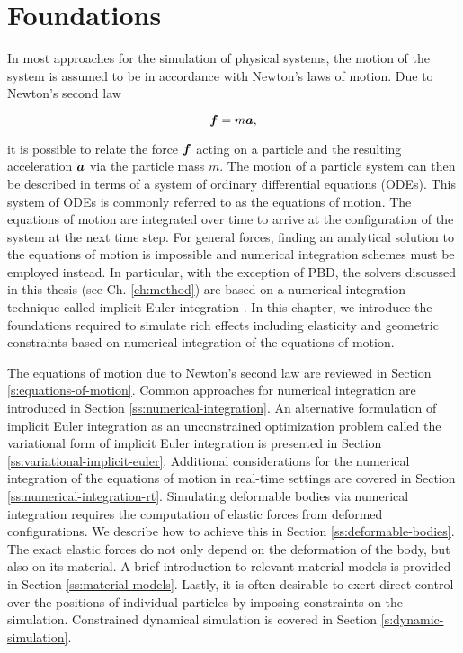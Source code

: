 \chapter{Foundations}\label{ch:foundations}

In most approaches for the simulation of physical systems, the motion of the system is assumed to be in accordance with Newton's laws of
motion. Due to Newton's second law 

\begin{equation}\label{newtons-laws-2}
    \bm{f} = m\bm{a},
\end{equation}

\noindent it is possible to relate the force $\bm{f}$ acting on a particle and the resulting acceleration $\bm{a}$ via the particle
mass $m$. The motion of a particle system can then be described in terms of a system of ordinary differential equations (ODEs). This
system of ODEs is commonly referred to as the equations of motion. The equations of motion are integrated over time to arrive 
at the configuration of the system at the next time step. For general forces, finding an analytical solution to the equations of motion
is impossible and numerical integration schemes must be employed instead. In particular, with the exception of PBD, the solvers discussed 
in this thesis (see Ch. \ref{ch:method}) are based on a numerical integration technique called implicit Euler integration 
\cite{macklin2016, bouaziz2014}. In this chapter, we introduce the foundations required to simulate rich effects including elasticity and 
geometric constraints based on numerical integration of the equations of motion.

The equations of motion due to Newton's second law are reviewed in Section \ref{s:equations-of-motion}. Common 
approaches for numerical integration are introduced in Section \ref{ss:numerical-integration}. An alternative formulation of implicit Euler integration 
as an unconstrained optimization problem called the variational form of implicit Euler integration is presented in Section \ref{ss:variational-implicit-euler}. 
Additional considerations for the numerical integration of the equations of motion in real-time settings are covered in 
Section \ref{ss:numerical-integration-rt}. Simulating deformable bodies via numerical integration requires the computation of elastic forces from 
deformed configurations. We describe how to achieve this in Section \ref{ss:deformable-bodies}. The exact elastic forces do not only depend on 
the deformation of the body, but also on its material. A brief introduction to relevant material models is provided in Section \ref{ss:material-models}.
Lastly, it is often desirable to exert direct control over the positions of individual particles by imposing constraints on the simulation. Constrained 
dynamical simulation is covered in Section \ref{s:dynamic-simulation}.


